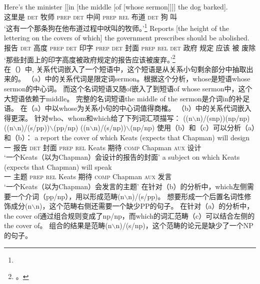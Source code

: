 \eal
\ex\label{Beispiel-Minister}
\gll Here's the         minister [[in                         [the                  middle [of [whose sermon]]]] the dog barked]. \\
     这里是 \textsc{det} 牧师      \hspaceThis{[[}\textsc{prep} \spacebr\textsc{det} 中间     \spacebr\textsc{prep} \textsc{rel} 布道 \textsc{det} 狗 叫 \\
\glt `这有一个那条狗在他布道过程中吠叫的牧师。'\footnote{}
\ex 
\gll Reports [the                 height of           the           lettering on            the          covers of which] the government prescribes should be abolished.\\
     报告     \spacebr\textsc{det} 高度   \textsc{prep} \textsc{det} 印字       \textsc{prep} \textsc{det} 封面    \textsc{prep} \textsc{rel} \textsc{det} 政府 规定 应该 被 废除 \\
\glt `那些封面上的印字高度被政府规定的报告应该被废弃。'\label{Ross-reports}\footnote{。\nocite{Ross86a-u}} \\
\zl
在（）中, 关系代词嵌入了一个短语中，这个短语是从关系小句剩余部分中抽取出来的。
（a）中的关系代词是限定词sermon。根据这个分析，whose是短语whose sermon的中心词。
而这个名词短语又随of嵌入了到短语of whose sermon中，这个大短语依赖于middle。
完整的名词短语the middle of the sermon是介词in的补足语。
在（a）中以whose为关系小句的中心词值得商榷。
（b）中的关系代词嵌入得更深。
\citet[]{Steedman97a}针对who、whom和which给了下列词汇项描写：
\eal
\label{le-relpron-Steedman}
\settowidth{}
\ex ((n$\backslash$n)/(s\bs np))\bs (np/np)       
\ex ((n$\backslash$n)/(s/pp))$\backslash$(pp/np)  
\ex ((n$\backslash$n)/(s/np))$\backslash$(np/np)  
\zl
使用（b）和（c）可以分析（a）和（b）：
\eal
\ex 
\gll a report the cover of which Keats (expects that Chapman) will design\\
一 报告 \textsc{det} 封面 \textsc{prep} \textsc{rel} Keats 期待 \textsc{comp} Chapman \textsc{aux} 设计\\
\glt `一个Keats（以为Chapman）会设计的报告的封面'
\ex 
\gll a subject on which Keats (expects that Chapman) will speak\\
一 主题 \textsc{prep} \textsc{rel} Keats 期待 \textsc{comp} Chapman \textsc{aux} 发言\\
\glt `一个Keats（以为Chapman）会发言的主题'
\zl
在针对（b）的分析中，which左侧需要一个介词（pp/np），用以形成范畴(n$\backslash$n)/(s/pp)。
想要形成一个后置名词性修饰成分(n$\backslash$n)，这个范畴右侧还需要一个缺少PP的句子。
在针对（a）的分析中，the cover of通过组合规则变成了np/np，而which的词汇范畴（c）可以结合左侧的the cover of。
组合的结果是范畴(n$\backslash$n)/(s/np)，这个范畴的论元是缺少了一个NP的句子。

